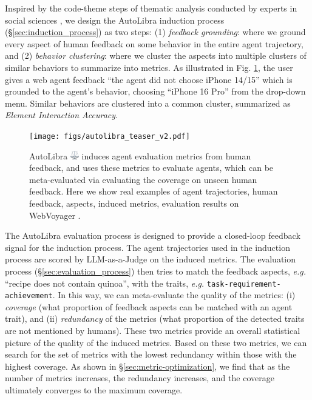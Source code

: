 Inspired by the code-theme steps of thematic analysis conducted by experts in
social sciences \citep{braun2006using}, we design the AutoLibra induction
process (\S\ref{sec:induction_process}) as two steps: (1) \emph{feedback
grounding}: where we ground every aspect of human feedback on some behavior in
the entire agent trajectory, and (2) \emph{behavior clustering}: where we cluster
the aspects into multiple clusters of similar behaviors to summarize into metrics.
As illustrated in Fig. \ref{fig:teaser}, the user gives a web agent feedback ``the
agent did not choose iPhone 14/15'' which is grounded to the agent's behavior, choosing
``iPhone 16 Pro'' from the drop-down menu. Similar behaviors are clustered into
a common cluster, summarized as \textit{Element Interaction Accuracy}.

\begin{figure}[!t]
	\centering
	\texttt{[image: figs/autolibra\_teaser\_v2.pdf]}
	\caption{AutoLibra \protect
	\includegraphics[height=1em]{figs/scale.png}
	induces agent evaluation metrics from human feedback, and uses these metrics to
	evaluate agents, which can be meta-evaluated via evaluating the coverage on
	unseen human feedback. Here we show real examples of agent trajectories, human
	feedback, aspects, induced metrics, evaluation results on WebVoyager \citep{he2024webvoyager}.}
	\label{fig:teaser}
\end{figure}

The AutoLibra evaluation process is designed to provide a closed-loop feedback signal
for the induction process. The agent trajectories used in the induction process
are scored by LLM-as-a-Judge \citep{zheng2023judging} on the induced metrics.
The evaluation process (\S\ref{sec:evaluation_process}) then tries to match the feedback
aspects, \emph{e.g.} ``recipe does not contain quinoa'', with the traits, \emph{e.g.}
\texttt{task-requirement-achievement}. In this way, we can meta-evaluate the quality
of the metrics: (i) \emph{coverage} (what proportion of feedback aspects can be
matched with an agent trait), and (ii) \emph{redundancy} of the metrics (what
proportion of the detected traits are not mentioned by humans). These two
metrics provide an overall statistical picture of the quality of the induced
metrics. Based on these two metrics, we can search for the set of metrics with
the lowest redundancy within those with the highest coverage. As shown in \S\ref{sec:metric-optimization},
we find that as the number of metrics increases, the redundancy increases, and the
coverage ultimately converges to the maximum coverage.

